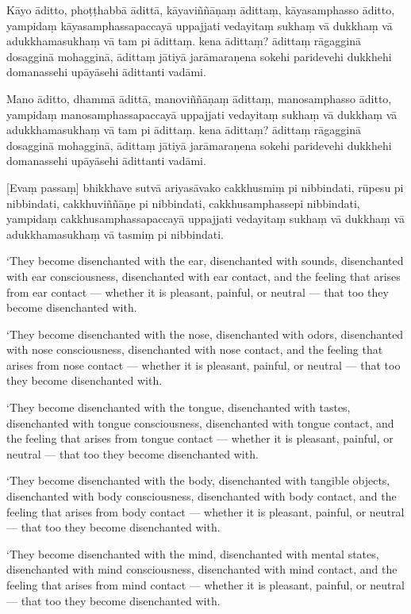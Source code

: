 Kāyo āditto, phoṭṭhabbā ādittā, kāyaviññāṇaṃ ādittaṃ, kāyasamphasso
āditto, yampidaṃ kāyasamphassapaccayā uppajjati vedayitaṃ sukhaṃ vā
dukkhaṃ vā adukkhamasukhaṃ vā tam pi ādittaṃ. kena ādittaṃ? ādittaṃ
rāgagginā dosagginā mohagginā, ādittaṃ jātiyā jarāmaraṇena sokehi
paridevehi dukkhehi domanassehi upāyāsehi ādittanti vadāmi.

Mano āditto, dhammā ādittā, manoviññāṇaṃ ādittaṃ, manosamphasso āditto,
yampidaṃ manosamphassapaccayā uppajjati vedayitaṃ sukhaṃ vā dukkhaṃ vā
adukkhamasukhaṃ vā tam pi ādittaṃ. kena ādittaṃ? ādittaṃ rāgagginā
dosagginā mohagginā, ādittaṃ jātiyā jarāmaraṇena sokehi paridevehi
dukkhehi domanassehi upāyāsehi ādittanti vadāmi.

\enlargethispage{2\baselineskip}

[Evaṃ passaṃ] bhikkhave sutvā ariyasāvako cakkhusmiṃ pi nibbindati,
rūpesu pi nibbindati, cakkhuviññāṇe pi nibbindati, cakkhusamphassepi
nibbindati, yampidaṃ cakkhusamphassapaccayā uppajjati vedayitaṃ sukhaṃ
vā dukkhaṃ vā adukkhamasukhaṃ vā tasmiṃ pi nibbindati.

\clearpage

\englishText
\markboth{\englishTitle}{\rightmark}

‘They become disenchanted with the ear, disenchanted with sounds,
disenchanted with ear consciousness, disenchanted with ear contact, and
the feeling that arises from ear contact --- whether it is pleasant,
painful, or neutral --- that too they become disenchanted with.

‘They become disenchanted with the nose, disenchanted with odors,
disenchanted with nose consciousness, disenchanted with nose contact,
and the feeling that arises from nose contact --- whether it is pleasant,
painful, or neutral --- that too they become disenchanted with.

‘They become disenchanted with the tongue, disenchanted with tastes,
disenchanted with tongue consciousness, disenchanted with tongue
contact, and the feeling that arises from tongue contact --- whether it is
pleasant, painful, or neutral --- that too they become disenchanted with.

‘They become disenchanted with the body, disenchanted with tangible
objects, disenchanted with body consciousness, disenchanted with body
contact, and the feeling that arises from body contact --- whether it is
pleasant, painful, or neutral --- that too they become disenchanted with.

‘They become disenchanted with the mind, disenchanted with mental
states, disenchanted with mind consciousness, disenchanted with mind
contact, and the feeling that arises from mind contact --- whether it is
pleasant, painful, or neutral --- that too they become disenchanted with.

